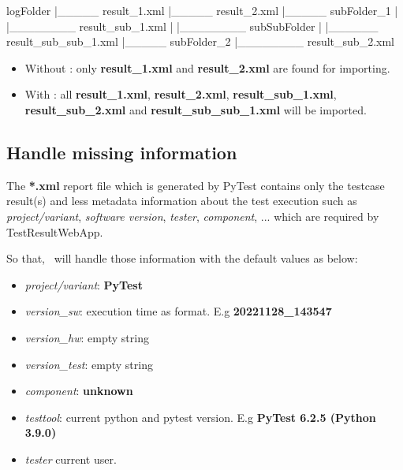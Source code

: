 \begin{robotlog}
logFolder
   |_____ result_1.xml
   |_____ result_2.xml
   |_____ subFolder_1
   |         |________ result_sub_1.xml
   |         |________ subSubFolder
   |                       |______ result_sub_sub_1.xml
   |_____ subFolder_2
             |________ result_sub_2.xml
\end{robotlog}

\begin{itemize}
\tightlist
\item
  Without : only \textbf{result\_1.xml} and
  \textbf{result\_2.xml} are found for importing.
\item
  With : all \textbf{result\_1.xml},
  \textbf{result\_2.xml}, \textbf{result\_sub\_1.xml},
  \textbf{result\_sub\_2.xml} and \textbf{result\_sub\_sub\_1.xml} will
  be imported.
\end{itemize}

\hypertarget{handle-missing-information}{%
\subsection{Handle missing
information}\label{handle-missing-information}}

The \textbf{*.xml} report file which is generated by PyTest contains
only the testcase result(s) and less metadata information about the test
execution such as \emph{project/variant}, \emph{software version},
\emph{tester}, \emph{component}, ... which are required by
TestResultWebApp.

So that, \pkg\ will handle those information with the default
values as below:

\begin{itemize}
\tightlist
\item
  \emph{project/variant}: \textbf{PyTest}
\item
  \emph{version\_sw}: execution time as 
  format. E.g \textbf{20221128\_143547}
\item
  \emph{version\_hw}: empty string
\item
  \emph{version\_test}: empty string
\item
  \emph{component}: \textbf{unknown}
\item
  \emph{testtool}: current python and pytest version. E.g
  \textbf{PyTest 6.2.5 (Python 3.9.0)}
\item
  \emph{tester} current user.
\end{itemize}

